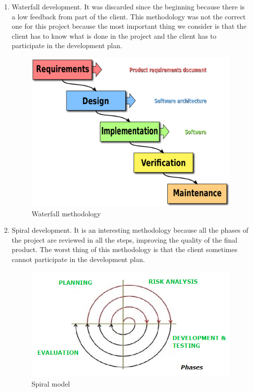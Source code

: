 \begin{enumerate}

\item Waterfall development. It was discarded since the beginning because there is a low feedback from part of the client. This methodology was not the correct one for this project because the most important thing we consider is that the client has to know what is done in the project and the client has to participate in the development plan.

\begin{figure}[H]
\begin{centering}
\includegraphics[scale=0.2]{IMGS/waterfall_methodology.png}
\caption{Waterfall methodology \label{Waterfall methodology}}
\end{centering}
\end{figure} 

\item Spiral development. It is an interesting methodology because all the phases of the project are reviewed in all the steps, improving the quality of the final product. The worst thing of this methodology is that the client sometimes cannot participate in the development plan.

\begin{figure}[H]
\begin{centering}
\includegraphics[scale=0.5]{IMGS/spiral-model.jpg}
\caption{Spiral model \label{Spiral model}}
\end{centering}
\end{figure} 


\end{enumerate}
